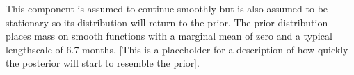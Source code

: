 This component is assumed to continue smoothly but is also assumed to be stationary so its distribution will return to the prior.
The prior distribution places mass on smooth functions with a marginal mean of zero and a typical lengthscale of 6.7 months.
[This is a placeholder for a description of how quickly the posterior will start to resemble the prior].